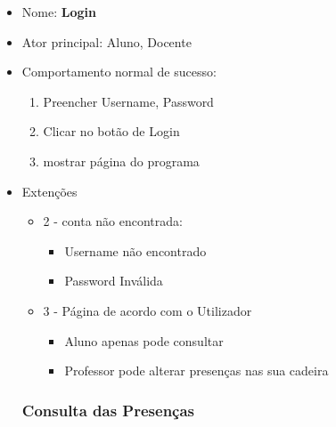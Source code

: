 \documentclass[11pt]{article}   %
\begin{document}
\begin{itemize}
    \item Nome: \textbf{Login}
    \item Ator principal: Aluno, Docente
    \item Comportamento normal de sucesso:
    \begin{enumerate}
        \item Preencher Username, Password
        \item Clicar no botão de Login
        \item mostrar página do programa
    \end{enumerate}
    \item Extenções
    \begin{itemize}
        \item 2 - conta não encontrada:
        \begin{itemize}
            \item Username não encontrado
            \item Password Inválida
        \end{itemize}
        \item 3 - Página de acordo com o Utilizador
        \begin{itemize}
            \item Aluno apenas pode consultar
            \item Professor pode alterar presenças nas sua cadeira
        \end{itemize}
\end{itemize}
    
\subsubsection{Consulta das Presenças}
    

\end{itemize}
\end{document}
